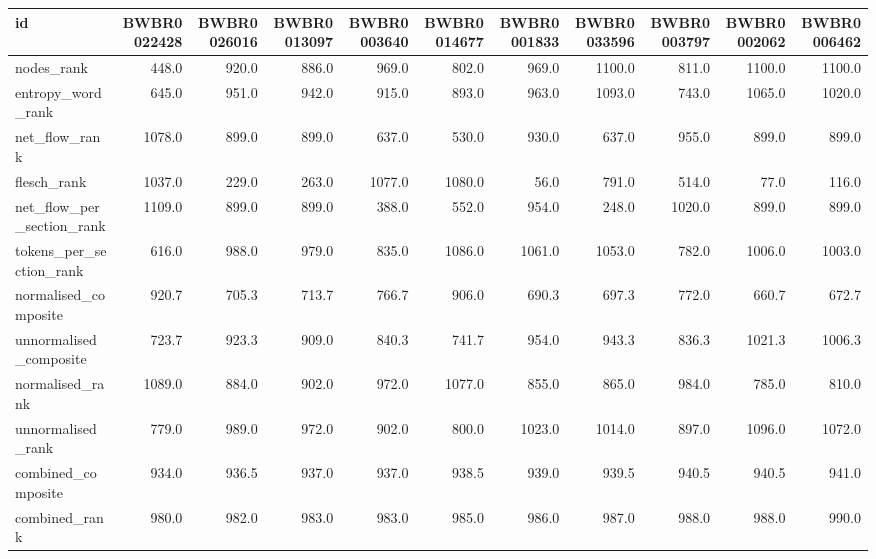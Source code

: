 \begin{tabular}{lrrrrrrrrrr}
\toprule
id & BWBR0022428 & BWBR0026016 & BWBR0013097 & BWBR0003640 & BWBR0014677 & BWBR0001833 & BWBR0033596 & BWBR0003797 & BWBR0002062 & BWBR0006462 \\
\midrule
nodes\_rank & 448.0 & 920.0 & 886.0 & 969.0 & 802.0 & 969.0 & 1100.0 & 811.0 & 1100.0 & 1100.0 \\
\cline{1-11}
entropy\_word\_rank & 645.0 & 951.0 & 942.0 & 915.0 & 893.0 & 963.0 & 1093.0 & 743.0 & 1065.0 & 1020.0 \\
\cline{1-11}
net\_flow\_rank & 1078.0 & 899.0 & 899.0 & 637.0 & 530.0 & 930.0 & 637.0 & 955.0 & 899.0 & 899.0 \\
\cline{1-11}
flesch\_rank & 1037.0 & 229.0 & 263.0 & 1077.0 & 1080.0 & 56.0 & 791.0 & 514.0 & 77.0 & 116.0 \\
\cline{1-11}
net\_flow\_per\_section\_rank & 1109.0 & 899.0 & 899.0 & 388.0 & 552.0 & 954.0 & 248.0 & 1020.0 & 899.0 & 899.0 \\
\cline{1-11}
tokens\_per\_section\_rank & 616.0 & 988.0 & 979.0 & 835.0 & 1086.0 & 1061.0 & 1053.0 & 782.0 & 1006.0 & 1003.0 \\
\cline{1-11}
normalised\_composite & 920.7 & 705.3 & 713.7 & 766.7 & 906.0 & 690.3 & 697.3 & 772.0 & 660.7 & 672.7 \\
\cline{1-11}
unnormalised\_composite & 723.7 & 923.3 & 909.0 & 840.3 & 741.7 & 954.0 & 943.3 & 836.3 & 1021.3 & 1006.3 \\
\cline{1-11}
normalised\_rank & 1089.0 & 884.0 & 902.0 & 972.0 & 1077.0 & 855.0 & 865.0 & 984.0 & 785.0 & 810.0 \\
\cline{1-11}
unnormalised\_rank & 779.0 & 989.0 & 972.0 & 902.0 & 800.0 & 1023.0 & 1014.0 & 897.0 & 1096.0 & 1072.0 \\
\cline{1-11}
combined\_composite & 934.0 & 936.5 & 937.0 & 937.0 & 938.5 & 939.0 & 939.5 & 940.5 & 940.5 & 941.0 \\
\cline{1-11}
combined\_rank & 980.0 & 982.0 & 983.0 & 983.0 & 985.0 & 986.0 & 987.0 & 988.0 & 988.0 & 990.0 \\
\cline{1-11}
\bottomrule
\end{tabular}
